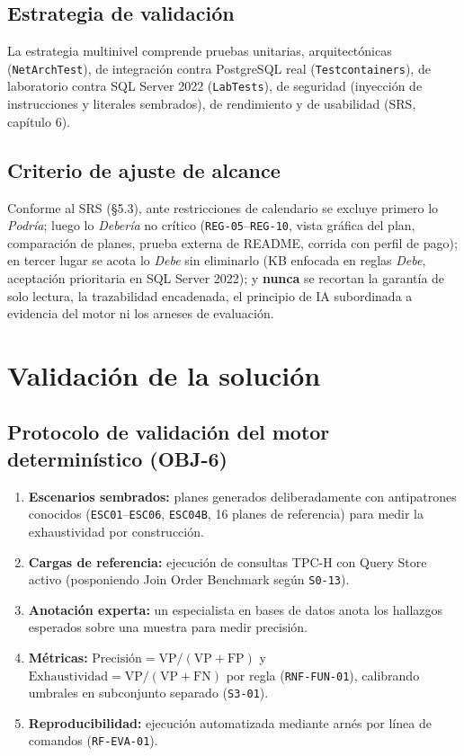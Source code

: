 \documentclass[12pt,a4paper]{article}
\begin{document}
\subsection{Estrategia de validación}

La estrategia multinivel comprende pruebas unitarias, arquitectónicas (\texttt{NetArchTest}), de integración contra PostgreSQL real (\texttt{Testcontainers}), de laboratorio contra SQL Server 2022 (\texttt{LabTests}), de seguridad (inyección de instrucciones y literales sembrados), de rendimiento y de usabilidad (SRS, capítulo 6).

\subsection{Criterio de ajuste de alcance}

Conforme al SRS (§5.3), ante restricciones de calendario se excluye primero lo \textit{Podría}; luego lo \textit{Debería} no crítico (\texttt{REG-05}--\texttt{REG-10}, vista gráfica del plan, comparación de planes, prueba externa de README, corrida con perfil de pago); en tercer lugar se acota lo \textit{Debe} sin eliminarlo (KB enfocada en reglas \textit{Debe}, aceptación prioritaria en SQL Server 2022); y \textbf{nunca} se recortan la garantía de solo lectura, la trazabilidad encadenada, el principio de IA subordinada a evidencia del motor ni los arneses de evaluación.

\section{Validación de la solución}

\subsection{Protocolo de validación del motor determinístico (OBJ-6)}

\begin{enumerate}[leftmargin=1.5em]
    \item \textbf{Escenarios sembrados:} planes generados deliberadamente con antipatrones conocidos (\texttt{ESC01}--\texttt{ESC06}, \texttt{ESC04B}, 16 planes de referencia) para medir la exhaustividad por construcción.
    \item \textbf{Cargas de referencia:} ejecución de consultas TPC-H \cite{tpch-spec} con Query Store activo (posponiendo Join Order Benchmark \cite{leis-job} según \texttt{S0-13}).
    \item \textbf{Anotación experta:} un especialista en bases de datos anota los hallazgos esperados sobre una muestra para medir precisión.
    \item \textbf{Métricas:} $\text{Precisión} = \text{VP} / (\text{VP} + \text{FP})$ y $\text{Exhaustividad} = \text{VP} / (\text{VP} + \text{FN})$ por regla (\texttt{RNF-FUN-01}), calibrando umbrales en subconjunto separado (\texttt{S3-01}).
    \item \textbf{Reproducibilidad:} ejecución automatizada mediante arnés por línea de comandos (\texttt{RF-EVA-01}).
\end{enumerate}
\end{document}
